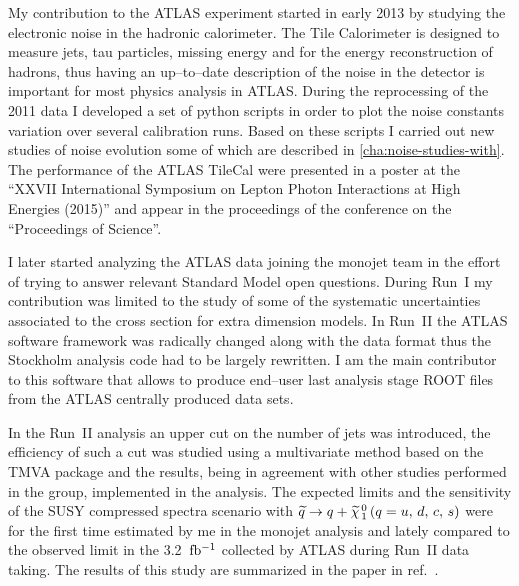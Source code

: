 My contribution to the ATLAS experiment started in early 2013 by studying the
electronic noise in the hadronic calorimeter. The Tile Calorimeter is designed
to measure jets, tau particles, missing energy and for the energy reconstruction
of hadrons, thus having an up--to--date description of the noise in the detector
is important for most physics analysis in ATLAS. During the reprocessing of the
2011 data I developed a set of python scripts in order to plot the noise
constants variation over several calibration runs. Based on these scripts I
carried out new studies of noise evolution some of which are described in
\cref{cha:noise-studies-with}. The performance of the ATLAS TileCal were
presented in a poster at the ``XXVII International Symposium on Lepton Photon
Interactions at High Energies (2015)'' and appear in the proceedings of the
conference on the ``Proceedings of Science''.

\mbox{}

I later started analyzing the ATLAS data joining the monojet team in the effort
of trying to answer relevant Standard Model open questions. During Run~I my
contribution was limited to the study of some of the systematic uncertainties
associated to the cross section for extra dimension models. In Run~II the ATLAS
software framework was radically changed along with the data format thus the
Stockholm analysis code had to be largely rewritten. I am the main contributor
to this software that allows to produce end--user last analysis stage ROOT files
from the ATLAS centrally produced data sets.

In the Run~II analysis an upper cut on the number of jets was introduced, the
efficiency of such a cut was studied using a multivariate method based on the
TMVA package and the results, being in agreement with other studies performed in
the group, implemented in the analysis. The expected limits and the sensitivity
of the SUSY compressed spectra scenario with $\widetilde{q} \rightarrow q + \widetilde{\chi}_{\, 1}^{\, 0}\, (q = u,\, d,\, c,\, s)$ were for the first
time estimated by me in the monojet analysis and lately compared to the observed
limit in the 3.2~$\mbox{fb$^{-1}$}$ collected by ATLAS during Run~II data taking. The
results of this study are summarized in the paper in ref.~\cite{MonoJetPaper}.
